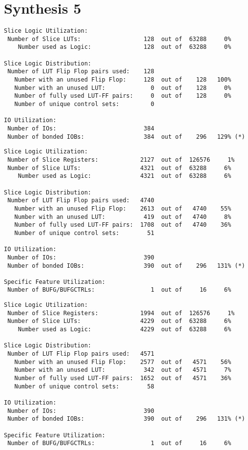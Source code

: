 \section{Synthesis 5}
\begin{verbatim}
Slice Logic Utilization: 
 Number of Slice LUTs:                  128  out of  63288     0%  
    Number used as Logic:               128  out of  63288     0%  

Slice Logic Distribution: 
 Number of LUT Flip Flop pairs used:    128
   Number with an unused Flip Flop:     128  out of    128   100%  
   Number with an unused LUT:             0  out of    128     0%  
   Number of fully used LUT-FF pairs:     0  out of    128     0%  
   Number of unique control sets:         0

IO Utilization: 
 Number of IOs:                         384
 Number of bonded IOBs:                 384  out of    296   129% (*) 
\end{verbatim}

\begin{verbatim}
Slice Logic Utilization: 
 Number of Slice Registers:            2127  out of  126576     1%  
 Number of Slice LUTs:                 4321  out of  63288     6%  
    Number used as Logic:              4321  out of  63288     6%  

Slice Logic Distribution: 
 Number of LUT Flip Flop pairs used:   4740
   Number with an unused Flip Flop:    2613  out of   4740    55%  
   Number with an unused LUT:           419  out of   4740     8%  
   Number of fully used LUT-FF pairs:  1708  out of   4740    36%  
   Number of unique control sets:        51

IO Utilization: 
 Number of IOs:                         390
 Number of bonded IOBs:                 390  out of    296   131% (*) 

Specific Feature Utilization:
 Number of BUFG/BUFGCTRLs:                1  out of     16     6%  
\end{verbatim}

\begin{verbatim}
Slice Logic Utilization: 
 Number of Slice Registers:            1994  out of  126576     1%  
 Number of Slice LUTs:                 4229  out of  63288     6%  
    Number used as Logic:              4229  out of  63288     6%  

Slice Logic Distribution: 
 Number of LUT Flip Flop pairs used:   4571
   Number with an unused Flip Flop:    2577  out of   4571    56%  
   Number with an unused LUT:           342  out of   4571     7%  
   Number of fully used LUT-FF pairs:  1652  out of   4571    36%  
   Number of unique control sets:        58

IO Utilization: 
 Number of IOs:                         390
 Number of bonded IOBs:                 390  out of    296   131% (*) 

Specific Feature Utilization:
 Number of BUFG/BUFGCTRLs:                1  out of     16     6%  
\end{verbatim}

